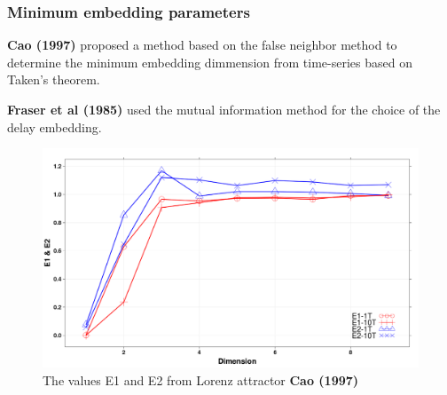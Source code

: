 \documentclass{beamer}
\begin{document}
\begin{frame}
\frametitle{Minimum embedding parameters}

\textbf{Cao (1997)} proposed a method 
based on the false neighbor method
to determine the minimum embedding dimmension
from time-series based on Taken's theorem.

\textbf{Fraser et al (1985)}  used the mutual information method 
for the choice of the delay embedding.

\begin{figure}
\centering 
\includegraphics[scale=0.12]{e1e2cao1997} \\
The values E1 and E2 from Lorenz attractor \textbf{Cao (1997)}
\end{figure}
\end{frame}
\end{document}
